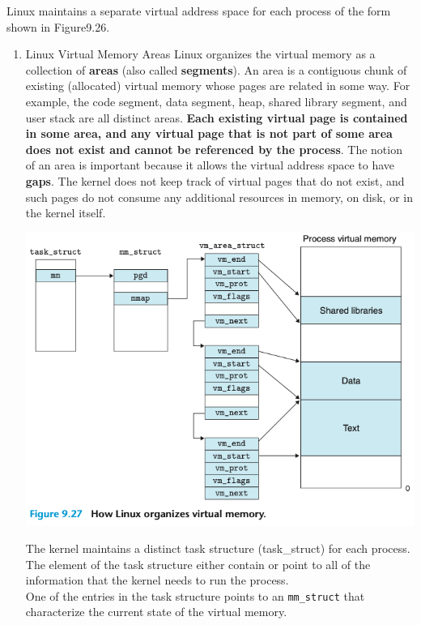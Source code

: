 \documentclass[11pt]{article}
\begin{document}
Linux maintains a separate virtual address space for each process of the form shown in Figure9.26.\\

\begin{enumerate}
\item Linux Virtual Memory Areas
\label{sec:orga8412f1}
Linux organizes the virtual memory as a collection of \textbf{areas} (also called \textbf{segments}). An area is a contiguous chunk of existing (allocated) virtual memory whose pages are related in some way. For example, the code segment, data segment, heap, shared library segment, and user stack are all distinct areas. \textbf{Each existing virtual page is contained in some area, and any virtual page that is not part of some area does not exist and cannot be referenced by the process}. The notion of an area is important because it allows the virtual address space to have \textbf{gaps}. The kernel does not keep track of virtual pages that do not exist, and such pages do not consume any additional resources in memory, on disk, or in the kernel itself.\\



\begin{center}
\includegraphics[width=.9\linewidth]{pics/figure9.27-vm-organization.png}
\end{center}

The kernel maintains a distinct task structure (task\_struct) for each process. The element of the task structure either contain or point to all of the information that the kernel needs to run the process.\\

One of the entries in the task structure points to an \texttt{mm\_struct} that characterize the current state of the virtual memory.\\


\end{enumerate}
\end{document}
